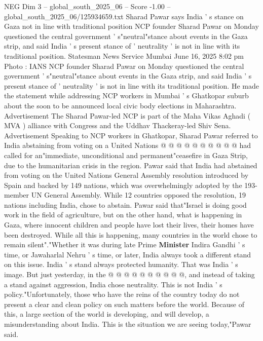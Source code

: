 \begin{textsample}{NEG Dim 3 – global\_south\_2025\_06 – Score -1.00 – global\_south\_2025\_06/125934659.txt}  \label{ex:f3_neg_270}
Sharad Pawar says India ' s stance on Gaza not in line with traditional position NCP founder Sharad Pawar on Monday questioned the central government ' s"neutral"stance about events in the Gaza strip, and said India ' s present stance of ' neutrality ' is not in line with its traditional position.
Statesman News Service Mumbai June 16, 2025 8:02 pm Photo : IANS NCP founder Sharad Pawar on Monday questioned the central government ' s"neutral"stance about events in the Gaza strip, and said India ' s present stance of ' neutrality ' is not in line with its traditional position.
He made the statement while addressing NCP workers in Mumbai ' s Ghatkopar suburb about the soon to be announced local civic body elections in Maharashtra.
Advertisement The Sharad Pawar-led NCP is part of the Maha Vikas Aghadi ( MVA ) alliance with Congress and the Uddhav Thackeray-led Shiv Sena.
Advertisement Speaking to NCP workers in Ghatkopar, Sharad Pawar referred to India abstaining from voting on a United Nations @ @ @ @ @ @ @ @ @ @ had called for an"immediate, unconditional and permanent"ceasefire in Gaza Strip, due to the humanitarian crisis in the region.
Pawar said that India had abstained from voting on the United Nations General Assembly resolution introduced by Spain and backed by 149 nations, which was overwhelmingly adopted by the 193-member UN General Assembly.
While 12 countries opposed the resolution, 19 nations including India, chose to abstain.
Pawar said that"Israel is doing good work in the field of agriculture, but on the other hand, what is happening in Gaza, where innocent children and people have lost their lives, their homes have been destroyed.
While all this is happening, many countries in the world chose to remain silent"."Whether it was during late Prime \textbf{Minister} Indira Gandhi ' s time, or Jawaharlal Nehru ' s time, or later, India always took a different stand on this issue.
India ' s stand always protected humanity.
That was India ' s image.
But just yesterday, in the @ @ @ @ @ @ @ @ @ @, and instead of taking a stand against aggression, India chose neutrality.
This is not India ' s policy."Unfortunately, those who have the reins of the country today do not present a clear and clean policy on such matters before the world.
Because of this, a large section of the world is developing, and will develop, a misunderstanding about India.
This is the situation we are seeing today,"Pawar said.

\end{textsample}
